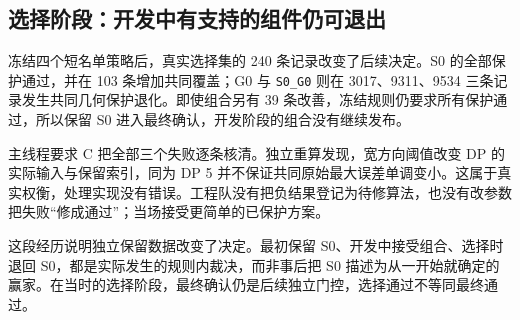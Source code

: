 \subsection{选择阶段：开发中有支持的组件仍可退出}
冻结四个短名单策略后，真实选择集的 240 条记录改变了后续决定。S0 的全部保护通过，并在 103 条增加共同覆盖；G0 与 \texttt{S0\_G0} 则在 3017、9311、9534 三条记录发生共同几何保护退化。即使组合另有 39 条改善，冻结规则仍要求所有保护通过，所以保留 S0 进入最终确认，开发阶段的组合没有继续发布。

主线程要求 C 把全部三个失败逐条核清。独立重算发现，宽方向阈值改变 DP 的实际输入与保留索引，同为 DP 5 并不保证共同原始最大误差单调变小。这属于真实权衡，处理实现没有错误。工程队没有把负结果登记为待修算法，也没有改参数把失败“修成通过”；当场接受更简单的已保护方案。

这段经历说明独立保留数据改变了决定。最初保留 S0、开发中接受组合、选择时退回 S0，都是实际发生的规则内裁决，而非事后把 S0 描述为从一开始就确定的赢家。在当时的选择阶段，最终确认仍是后续独立门控，选择通过不等同最终通过。
